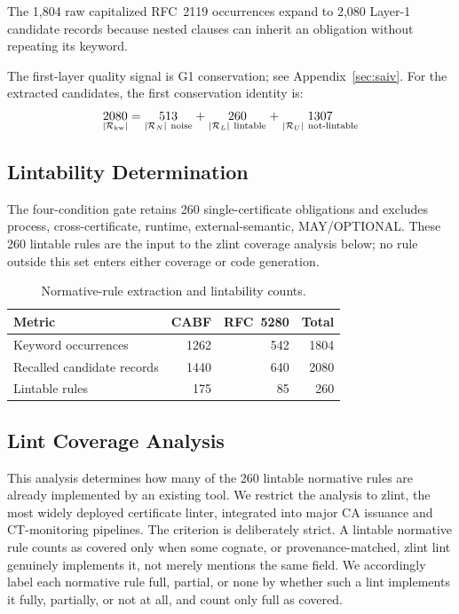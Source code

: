 The 1,804 raw capitalized RFC~2119 occurrences expand to 2,080 Layer-1
candidate records because nested clauses can inherit an obligation without
repeating its keyword.

The first-layer quality signal is G1 conservation; see Appendix~\ref{sec:saiv}. For the extracted candidates, the first conservation
identity is:
\[
\begin{array}{c @{\;} c @{\;} c @{\;} c @{\;} c @{\;} c @{\;} c}
  \underset{|\Rkw|}{2080} & = & \underset{|\RN|\ \text{noise}}{513} & + & \underset{|\RL|\ \text{lintable}}{260} & + & \underset{|\RU|\ \text{not-lintable}}{1307}
\end{array}
\]

\subsection{Lintability Determination}
\label{subsec:lintability-eval}

The four-condition gate retains 260 single-certificate obligations and excludes
process, cross-certificate, runtime, external-semantic, MAY/OPTIONAL. These 260 lintable rules are the input to the zlint coverage
analysis below; no rule outside this set enters either coverage or code generation.

\begin{table}[tb]
\centering
\small
\setlength{\tabcolsep}{3pt}
\caption{Normative-rule extraction and lintability counts.}
\label{tab:rule-recall}
\begin{tabularx}{\columnwidth}{@{}X r r r@{}}
\toprule
Metric & CABF & RFC~5280 & Total \\
\midrule
Keyword occurrences & 1262 & 542 & 1804 \\
Recalled candidate records & 1440 & 640 & 2080 \\
Lintable rules & 175 & 85 & 260 \\
\bottomrule
\end{tabularx}
\end{table}

\subsection{Lint Coverage Analysis}
\label{subsec:coverage}

This analysis determines how many of the 260 lintable normative rules are
already implemented by an existing tool. We restrict the analysis to zlint,
the most widely deployed certificate linter, integrated into major CA issuance
and CT-monitoring pipelines. The criterion is deliberately strict. A lintable
normative rule counts as covered only when some cognate, or provenance-matched,
zlint lint genuinely implements it, not merely mentions the same field. We
accordingly label each normative rule full, partial, or none by whether such a
lint implements it fully, partially, or not at all, and count only full as
covered.

